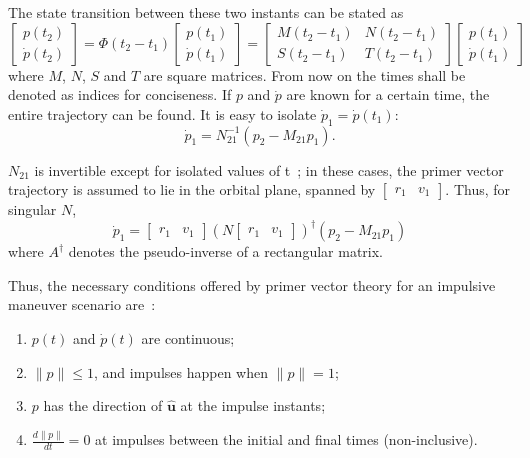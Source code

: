 The state transition between these two instants can be stated as
\begin{equation}
    \begin{bmatrix}
        p(t_2) \\ \dot{p}(t_2)
    \end{bmatrix} = \Phi(t_2 - t_1) \begin{bmatrix}
        p(t_1) \\ \dot{p}(t_1)
    \end{bmatrix} = \begin{bmatrix}
        M(t_2-t_1) & N(t_2-t_1) \\ S(t_2-t_1) & T(t_2-t_1)
    \end{bmatrix} \begin{bmatrix}
        p(t_1) \\ \dot{p}(t_1)
    \end{bmatrix}
\end{equation}
where \(M\), \(N\), \(S\) and \(T\) are square matrices. From now on the times shall be denoted as indices for conciseness. If \(p\) and \(\dot{p}\) are known for a certain time, the entire trajectory can be found. It is easy to isolate \(\dot{p}_1 = \dot{p}(t_1)\):
\begin{equation}
    \dot{p}_1 = N^{-1}_{21} \left(p_2 - M_{21}p_1\right).
\end{equation}

\(N_{21}\) is invertible except for isolated values of t~\cite{Conway_2010}; in these cases, the primer vector trajectory is assumed to lie in the orbital plane, spanned by \(\begin{bmatrix}
    r_1 & v_1
\end{bmatrix}\). Thus, for singular \(N\),
\begin{equation}
    \dot{p}_1 = \begin{bmatrix}
        r_1 & v_1
    \end{bmatrix} (N \begin{bmatrix}
        r_1 & v_1
    \end{bmatrix})^\dagger \left(p_2 - M_{21}p_1\right)
\end{equation}
where \(A^\dagger\) denotes the pseudo-inverse of a rectangular matrix.

Thus, the necessary conditions offered by primer vector theory for an impulsive maneuver scenario are~\cite{Conway_2010}:
\begin{enumerate}
    \item \(p(t)\) and \(\dot{p}(t)\) are continuous;
    \item \(\lVert p \rVert \leq 1\), and impulses happen when \(\lVert p \rVert = 1\);
    \item \(p\) has the direction of \(\hat{\mathbf{u}}\) at the impulse instants;
    \item \(\frac{d \lVert p \rVert}{dt} = 0\) at impulses between the initial and final times (non-inclusive).
\end{enumerate}